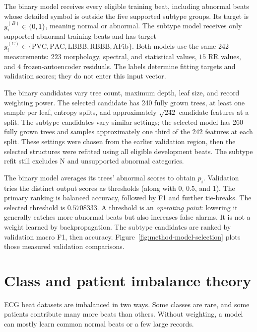 The binary model receives every eligible training beat, including abnormal
beats whose detailed symbol is outside the five supported subtype groups. Its
target is $y_i^{(B)}\in\{0,1\}$, meaning normal or abnormal. The subtype
model receives only supported abnormal training beats and has target
$y_i^{(C)}\in\{\mathrm{PVC,PAC,LBBB,RBBB,AFib}\}$. Both models use the same
242 measurements: $223$ morphology, spectral, and statistical values, $15$
RR values, and $4$ frozen-autoencoder residuals. The labels determine fitting
targets and validation scores; they do not enter this input vector.

The binary candidates vary tree count, maximum depth, leaf size, and record
weighting power. The selected candidate has 240 fully grown trees, at least
one sample per leaf, entropy splits, and approximately $\sqrt{242}$ candidate
features at a split. The subtype candidates vary similar settings; the
selected model has 260 fully grown trees and samples approximately one third
of the 242 features at each split. These settings were chosen from the
earlier validation region, then the selected structures were refitted using
all eligible development beats. The subtype refit still excludes N and
unsupported abnormal categories.

The binary model averages its trees' abnormal scores to obtain $p_i$.
Validation tries the distinct output scores as thresholds (along with 0,
0.5, and 1). The primary ranking is balanced accuracy, followed by F1 and
further tie-breaks. The selected threshold is $0.5708333$. A threshold is an
\emph{operating point}: lowering it generally catches more abnormal beats but
also increases false alarms. It is not a weight learned by backpropagation.
The subtype candidates are ranked by validation macro F1, then accuracy.
Figure~\ref{fig:method-model-selection} plots those measured validation
comparisons.

\section{Class and patient imbalance theory}

ECG beat datasets are imbalanced in two ways. Some classes are rare, and some
patients contribute many more beats than others. Without weighting, a model can
mostly learn common normal beats or a few large records.

